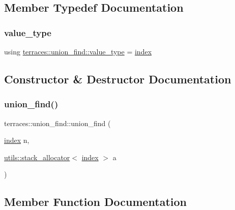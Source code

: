 \subsection{Member Typedef Documentation}
\mbox{\label{classterraces_1_1union__find_a72c65370f63e73215aad5d3ffdde3e55}} 
\subsubsection{\texorpdfstring{value\+\_\+type}{value\_type}}
{\footnotesize\ttfamily using \hyperlink{classterraces_1_1union__find_a72c65370f63e73215aad5d3ffdde3e55}{terraces\+::union\+\_\+find\+::value\+\_\+type} =  \hyperlink{namespaceterraces_adbc33ccb543d1634e96d0eb02e472c77}{index}}



\subsection{Constructor \& Destructor Documentation}
\mbox{\label{classterraces_1_1union__find_a6a2c8c169e8c19b55c78b8e426d3d7b6}} 
\subsubsection{\texorpdfstring{union\+\_\+find()}{union\_find()}}
{\footnotesize\ttfamily terraces\+::union\+\_\+find\+::union\+\_\+find (\begin{DoxyParamCaption}\item[{\hyperlink{namespaceterraces_adbc33ccb543d1634e96d0eb02e472c77}{index}}]{n,  }\item[{\hyperlink{classterraces_1_1utils_1_1stack__allocator}{utils\+::stack\+\_\+allocator}$<$ \hyperlink{namespaceterraces_adbc33ccb543d1634e96d0eb02e472c77}{index} $>$}]{a }\end{DoxyParamCaption})}



\subsection{Member Function Documentation}
\mbox{\label{classterraces_1_1union__find_a8c6d1cabc854aedf4b04c6047680b03c}} 
